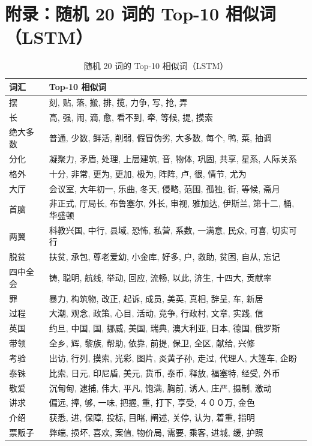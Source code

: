\documentclass[11pt]{article}
\begin{document}
\section*{附录：随机 20 词的 Top-10 相似词（LSTM）}
\begin{table}[H]
    \centering
    \caption{随机 20 词的 Top-10 相似词（LSTM）}
    \small
    \begin{tabularx}{\textwidth}{p{2.6cm}X}
        \toprule
        词汇 & Top-10 相似词 \\
        \midrule
        摆 & 刻, 贴, 落, 搬, 排, 揽, 力争, 写, 抢, 弄 \\
        长 & 高, 强, 闹, 滴, 愈, 看不到, 牵, 等候, 提, 摸索 \\
        绝大多数 & 普通, 少数, 鲜活, 削弱, 假冒伪劣, 大多数, 每个, 鸭, 菜, 抽调 \\
        分化 & 凝聚力, 矛盾, 处理, 上层建筑, 音, 物体, 巩固, 共享, 星系, 人际关系 \\
        格外 & 十分, 非常, 更为, 更加, 极为, 阵阵, 卢, 很, 情节, 尤为 \\
        大厅 & 会议室, 大年初一, 乐曲, 冬天, 侵略, 范围, 孤独, 街, 等候, 斋月 \\
        首脑 & 非正式, 厅局长, 布鲁塞尔, 外长, 审视, 雅加达, 伊斯兰, 第十二, 桶, 华盛顿 \\
        两翼 & 科教兴国, 中行, 县域, 恐怖, 私营, 系数, 一满意, 民众, 可喜, 切实可行 \\
        脱贫 & 扶贫, 承包, 尊老爱幼, 小金库, 好多, 户, 救助, 贫困, 自从, 忘记 \\
        四中全会 & 铸, 聪明, 航线, 举动, 回应, 流畅, 以此, 济生, 十四大, 贡献率 \\
        罪 & 暴力, 构筑物, 改正, 起诉, 成员, 美英, 真相, 辞呈, 车, 新居 \\
        过程 & 大潮, 观念, 政策, 心目, 活动, 竞争, 行政村, 文章, 实践, 信 \\
        英国 & 约旦, 中国, 国, 挪威, 美国, 瑞典, 澳大利亚, 日本, 德国, 俄罗斯 \\
        带领 & 全乡, 辉, 黎族, 帮助, 依靠, 前提, 保卫, 全区, 献给, 兴修 \\
        考验 & 出访, 行列, 摸索, 光彩, 图片, 炎黄子孙, 走过, 代理人, 大篷车, 企盼 \\
        泰铢 & 比索, 日元, 印尼盾, 美元, 货币, 泰币, 释放, 福塞特, 经受, 外币 \\
        敬爱 & 沉甸甸, 逮捕, 伟大, 平凡, 饱满, 胸前, 诱人, 庄严, 摄制, 激动 \\
        讲求 & 偏远, 捧, 够, 一味, 把握, 重, 打下, 享受, ４００万, 金色 \\
        介绍 & 获悉, 进, 保障, 投标, 目睹, 阐述, 关停, 认为, 着重, 指明 \\
        票贩子 & 弊端, 损坏, 喜欢, 案值, 物价局, 需要, 乘客, 进城, 缓, 护照 \\
        \bottomrule
    \end{tabularx}
    \label{tab:top10}
\end{table}
\end{document}
